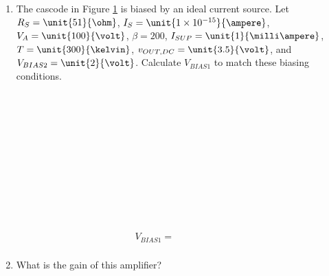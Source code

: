 \documentclass{article}
\begin{document}
\thispagestyle{plain}

\name

\begin{enumerate}

	\begin{figure}[!htb]
		
		\centerline{\box\graph}
		\caption{Cascode amplifier with ideal current source}
		\label{cascode1}
	\end{figure}

	\item The cascode in Figure \ref{cascode1} is biased by an ideal current source. Let $R_S = \unit{51}{\ohm}$, $I_S = \unit{1\times10^{-15}}{\ampere}$, $V_A = \unit{100}{\volt}$, $\beta = 200$, $I_{SUP} = \unit{1}{\milli\ampere}$, $T = \unit{300}{\kelvin}$, $v_{OUT,DC} = \unit{3.5}{\volt}$, and $V_{BIAS2} = \unit{2}{\volt}$. Calculate $V_{BIAS1}$ to match these biasing conditions. \\~\\~\\~\\~\\~\\~\\~\\~\\~\\~\\~\\

	\begin{align*}
    		\boxed{V_{BIAS1} = ~~~~~~~~~~~~~~~~~~~~~~~~~ } \\
      	\end{align*}

	\item What is the gain of this amplifier? \\~\\~\\~\\~\\~\\~\\~\\~\\~\\~\\~\\


\end{enumerate}
\end{document}
